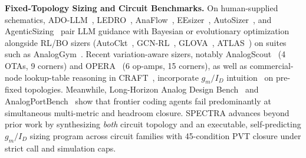 \textbf{Fixed-Topology Sizing and Circuit Benchmarks.}
On human-supplied schematics, ADO-LLM~\cite{yin2024adollm}, LEDRO~\cite{kochar2025ledro}, AnaFlow~\cite{ahmadzadeh2025anaflow}, EEsizer~\cite{liu2026eesizer}, AutoSizer~\cite{yu2026autosizer}, and AgenticSizing~\cite{hao2026agenticsizing} pair LLM guidance with Bayesian or evolutionary optimization alongside RL/BO sizers (AutoCkt~\cite{settaluri2020autockt}, GCN-RL~\cite{wang2020gcnrl}, GLOVA~\cite{kim2025glova}, ATLAS~\cite{oh2026atlas}) on suites such as AnalogGym~\cite{li2024analoggym}. Recent variation-aware sizers, notably AnalogScout~\cite{long2026analogscout} (4 OTAs, 9 corners) and OPERA~\cite{saxena2026opera} (6 op-amps, 15 corners), as well as commercial-node lookup-table reasoning in CRAFT~\cite{park2026craft}, incorporate $g_m/I_D$ intuition~\cite{jespers2017gmid} on pre-fixed topologies. Meanwhile, Long-Horizon Analog Design Bench~\cite{adbench2026longhorizon} and AnalogPortBench~\cite{rajabi2026analogportbench} show that frontier coding agents fail predominantly at simultaneous multi-metric and headroom closure. \textsc{SPECTRA} advances beyond prior work by synthesizing \emph{both} circuit topology and an executable, self-predicting $g_m/I_D$ sizing program across \NPrimaryFamilies{} circuit families with 45-condition PVT closure under strict call and simulation caps.

